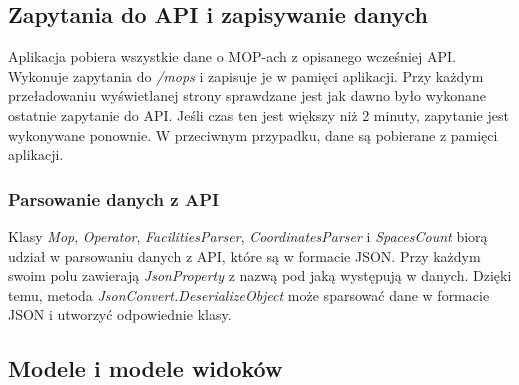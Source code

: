 \subsection{Zapytania do API i zapisywanie danych}
Aplikacja pobiera wszystkie dane o MOP-ach z opisanego wcześniej API. Wykonuje zapytania do \textit{/mops} i zapisuje je w pamięci aplikacji. Przy każdym przeładowaniu wyświetlanej strony sprawdzane jest jak dawno było wykonane ostatnie zapytanie do API. Jeśli czas ten jest większy niż 2 minuty, zapytanie jest wykonywane ponownie. W przeciwnym przypadku, dane są pobierane z pamięci aplikacji.

\subsubsection{Parsowanie danych z API}
Klasy \textit{Mop}, \textit{Operator}, \textit{FacilitiesParser}, \textit{CoordinatesParser} i \textit{SpacesCount} biorą udział w parsowaniu danych z API, które są w formacie JSON. Przy każdym swoim polu zawierają \textit{JsonProperty} z nazwą pod jaką występują w danych. Dzięki temu, metoda \textit{JsonConvert.DeserializeObject} może sparsować dane w formacie JSON i utworzyć odpowiednie klasy.

\subsection{Modele i modele widoków}
